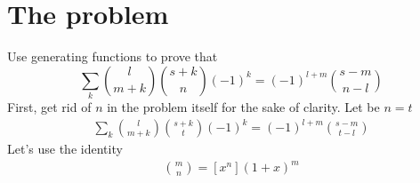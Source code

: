 ﻿\documentclass{article}
\begin{document}
    \section{The problem}\label{sec:the-problem}
    Use generating functions to prove that
    \begin{equation}
        \sum_{k} \binom{l}{m+k} \binom{s+k}{n} (-1)^k = (-1)^{l+m} \binom{s-m}{n-l}
        \label{eq:identity-to-prove}
    \end{equation}
    First, get rid of $n$ in the problem itself for the sake of clarity.
    Let be $n=t$
    \begin{align*}
        \sum_{k} \binom{l}{m+k} \binom{s+k}{t} (-1)^k = (-1)^{l+m} \binom{s-m}{t-l}
    \end{align*}
    Let's use the identity
    \begin{align*}
         \binom{m}{n} = [x^n] (1+x)^m
    \end{align*}
\end{document}
